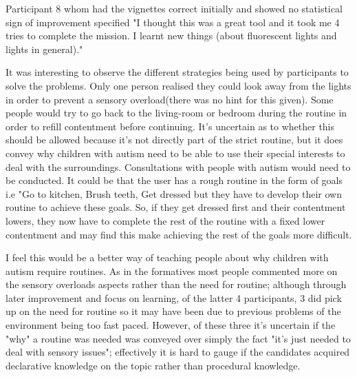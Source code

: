 Participant 8 whom had the vignettes correct initially and showed no statistical sign of improvement specified "I thought this was a great tool and it took me 4 tries to complete the mission. I learnt new things (about fluorescent lights and lights in general)."

It was interesting to observe the different strategies being used by participants to solve the problems. Only one person realised they could look away from the lights in order to prevent a sensory overload(there was no hint for this given). Some people would try to go back to the living-room or bedroom during the routine in order to refill contentment before continuing. It's uncertain as to whether this should be allowed because it's not directly part of the strict routine, but it does convey why children with autism need to be able to use their special interests to deal with the surroundings. Consultations with people with autism would need to be conducted. It could be that the user has a rough routine in the form of goals i.e "Go to kitchen, Brush teeth, Get dressed but they have to develop their own routine to achieve these goals. So, if they get dressed first and their contentment lowers, they now have to complete the rest of the routine with a fixed lower contentment and may find this make achieving the rest of the goals more difficult.

I feel this would be a better way of teaching people about why children with autism require routines. As in the formatives most people commented more on the sensory overloads aspects rather than the need for routine; although through later improvement and focus on learning, of the latter 4 participants, 3 did pick up on the need for routine so it may have been due to previous problems of the environment being too fast paced. However, of these three it's uncertain if the "why" a routine was needed was conveyed over simply the fact "it's just needed to deal with sensory issues"; effectively it is hard to gauge if the candidates acquired declarative knowledge on the topic rather than procedural knowledge.  

